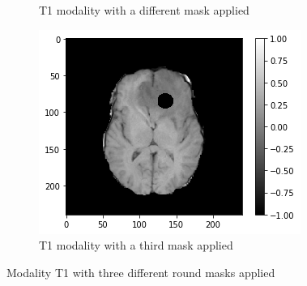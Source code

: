 \begin{figure}[H]
\begin{subfigure}[t]{.33\textwidth}
        \caption{T1 modality with a different mask applied}
    \end{subfigure}
    \begin{subfigure}[t]{.33\textwidth}
        \centering
        \includegraphics[width=\linewidth]{chapters/06_hdm/images_masked/masked_8.png}
        \caption{T1 modality with a third mask applied}
    \end{subfigure}
    \caption{Modality T1 with three different round masks applied}
    \label{hdm_masks_1}
\end{figure}

